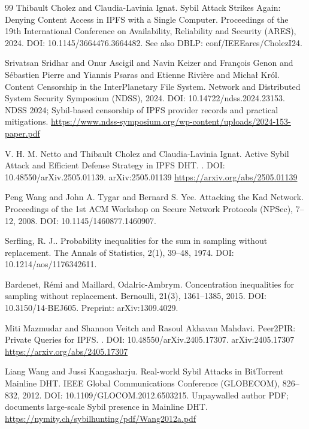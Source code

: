 \documentclass[11pt]{article}
\begin{document}
\begin{thebibliography}{99}
Thibault Cholez and Claudia-Lavinia Ignat.
\newblock Sybil Attack Strikes Again: Denying Content Access in {IPFS} with a Single Computer.
\newblock Proceedings of the 19th International Conference on Availability, Reliability and Security (ARES), 2024.
\newblock DOI: 10.1145/3664476.3664482.
\newblock See also DBLP: conf/IEEEares/CholezI24.

Srivatsan Sridhar and Onur Ascigil and Navin Keizer and Fran{\c{c}}ois Genon and S{\'e}bastien Pierre and Yiannis Psaras and Etienne Rivi{\`e}re and Micha{\l} Kr{\'o}l.
\newblock Content Censorship in the InterPlanetary File System.
\newblock Network and Distributed System Security Symposium (NDSS), 2024.
\newblock DOI: 10.14722/ndss.2024.23153.
\newblock NDSS 2024; Sybil-based censorship of IPFS provider records and practical mitigations.
\newblock \url{https://www.ndss-symposium.org/wp-content/uploads/2024-153-paper.pdf}

V. H. M. Netto and Thibault Cholez and Claudia-Lavinia Ignat.
\newblock Active Sybil Attack and Efficient Defense Strategy in {IPFS} {DHT}.
.
\newblock DOI: 10.48550/arXiv.2505.01139.
\newblock arXiv:2505.01139
\newblock \url{https://arxiv.org/abs/2505.01139}

Peng Wang and John A. Tygar and Bernard S. Yee.
\newblock Attacking the {Kad} Network.
\newblock Proceedings of the 1st ACM Workshop on Secure Network Protocols (NPSec), 7--12, 2008.
\newblock DOI: 10.1145/1460877.1460907.

Serfling, R. J..
\newblock Probability inequalities for the sum in sampling without replacement.
\newblock The Annals of Statistics, 2(1), 39--48, 1974.
\newblock DOI: 10.1214/aos/1176342611.

Bardenet, R{\'e}mi and Maillard, Odalric-Ambrym.
\newblock Concentration inequalities for sampling without replacement.
\newblock Bernoulli, 21(3), 1361--1385, 2015.
\newblock DOI: 10.3150/14-BEJ605.
\newblock Preprint: arXiv:1309.4029.

Miti Mazmudar and Shannon Veitch and Rasoul Akhavan Mahdavi.
\newblock Peer2PIR: Private Queries for {IPFS}.
.
\newblock DOI: 10.48550/arXiv.2405.17307.
\newblock arXiv:2405.17307
\newblock \url{https://arxiv.org/abs/2405.17307}

Liang Wang and Jussi Kangasharju.
\newblock Real-world Sybil Attacks in {BitTorrent} Mainline {DHT}.
 {IEEE} Global Communications Conference (GLOBECOM), 826--832, 2012.
\newblock DOI: 10.1109/GLOCOM.2012.6503215.
\newblock Unpaywalled author PDF; documents large-scale Sybil presence in Mainline DHT.
\newblock \url{https://nymity.ch/sybilhunting/pdf/Wang2012a.pdf}


\end{thebibliography}
\end{document}
